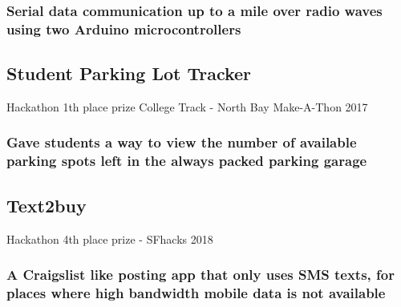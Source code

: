 \documentclass{article}
\begin{document}
		\subsubsection{ Serial data communication up to a mile over radio waves using two Arduino microcontrollers}
	\subsection{Student Parking Lot Tracker} Hackathon 1th place prize College Track - North Bay Make-A-Thon 2017
    	\vspace{-3mm}
		\subsubsection{Gave students a way to view the number of available parking spots left in the always packed parking garage}
		
	\subsection{Text2buy} Hackathon 4th place prize - SFhacks 2018
    	\vspace{-3mm}
		\subsubsection{A Craigslist  like posting app that only uses SMS texts, for places where high bandwidth mobile data is not available}
		
\end{document}
